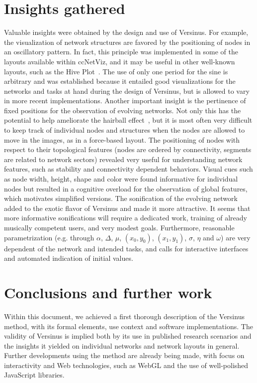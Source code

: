 \documentclass[runningheads]{llncs}
\begin{document}
\section{Insights gathered}\label{sec:ins}
Valuable insights were obtained by the design and use of Versinus.
For example, the visualization of network structures are favored by the positioning of nodes in an oscillatory pattern. In fact, this principle was implemented in some of the layouts available within ccNetViz, and it may be useful in other well-known layouts, such as the Hive Plot~\cite{hive}. The use of only one period for the sine is arbitrary and was established because it entailed good visualizations for the networks and tasks at hand during the design of Versinus, but is allowed to vary in more recent implementations.
Another important insight is the pertinence of fixed positions for the observation of evolving networks. Not only this has the potential to help ameliorate the hairball effect~\cite{hairball}, but it is most often very difficult to keep track of individual nodes and structures when the nodes are allowed to move in the images, as in a force-based layout.
The positioning of nodes with respect to their topological features (nodes are ordered by connectivity, segments are related to network sectors) revealed very useful for understanding network features, such as stability and connectivity dependent behaviors.
Visual cues such as node width, height, shape and color were found informative for individual nodes but resulted in a cognitive overload for the observation of global features, which motivates simplified versions.
The sonification of the evolving network added to the exotic flavor of Versinus and made it more attractive. It seems that more informative sonifications will require a dedicated work, training of already musically competent users, and very modest goals. 
Furthermore, reasonable parametrization (e.g. through $\alpha$, $\Delta$, $\mu$, $(x_0, y_0)$, $(x_1, y_1)$, $\sigma$, $\eta$ and $\omega$) are very dependent of the network and intended tasks, and calls for interactive interfaces and automated indication of initial values.

\section{Conclusions and further work}\label{sec:con}
Within this document, we achieved a first thorough description of the Versinus method, with its formal elements, use context and software implementations.
The validity of Versinus is implied both by its use in published research scenarios and the insights it yielded on individual networks and network layouts in general.
Further developments using the method are already being made, with focus on interactivity and Web technologies, such as WebGL and the use of well-polished JavaScript libraries.
\end{document}
